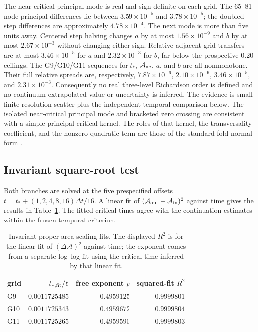 \documentclass[11pt]{article}
\begin{document}
The near-critical principal mode is real and sign-definite on each grid.  The 65--81-node
principal differences lie between $3.59\times10^{-5}$ and
$3.78\times10^{-5}$; the doubled-step differences are approximately
$4.78\times10^{-4}$.  The next mode is more than five units away.  Centered
step halving changes $a$ by at most $1.56\times10^{-9}$ and $b$ by at most
$2.67\times10^{-3}$ without changing either sign.  Relative adjacent-grid
transfers are at most $3.46\times10^{-5}$ for $a$ and
$2.32\times10^{-3}$ for $b$, far below the prospective $0.20$ ceilings.
The G9/G10/G11 sequences for $t_*$, $\mathcal A_{\rm nc}$, $a$, and $b$ are all
nonmonotone.  Their full relative spreads are, respectively,
$7.87\times10^{-6}$, $2.10\times10^{-6}$,
$3.46\times10^{-5}$, and $2.31\times10^{-3}$.  Consequently no real
three-level Richardson order is defined and no continuum-extrapolated value
or uncertainty is inferred.  The evidence is small finite-resolution scatter
plus the independent temporal comparison below.  The isolated near-critical
principal mode and bracketed zero crossing are consistent with a simple
principal critical kernel.  The roles of that kernel, the transversality
coefficient, and the nonzero quadratic term are those of the standard fold
normal form \cite{Kuznetsov2004}.

\subsection{Invariant square-root test}

Both branches are solved at the five prespecified offsets
$t=t_*+(1,2,4,8,16)\Delta t/16$.  A linear fit of
$(\mathcal A_{\rm out}-\mathcal A_{\rm in})^2$ against time gives the results in
Table~\ref{tab:supp-scaling}.  The fitted critical times agree with the
continuation estimates within the frozen temporal criterion.

\begin{table}[ht]
\centering
\caption{Invariant proper-area scaling fits.  The displayed $R^2$ is for the
linear fit of $(\Delta\mathcal A)^2$ against time; the exponent comes from a
separate log--log fit using the critical time inferred by that linear fit.}
\label{tab:supp-scaling}
\begin{tabular}{@{}lrrr@{}}
\toprule
grid & $t_{*,\rm fit}/\ell$ & free exponent $p$ & squared-fit $R^2$ \\
\midrule
G9  & $0.0011725485$ & $0.4959125$ & $0.9999801$ \\
G10 & $0.0011725343$ & $0.4959672$ & $0.9999804$ \\
G11 & $0.0011725265$ & $0.4959590$ & $0.9999803$ \\
\bottomrule
\end{tabular}
\end{table}
\end{document}
